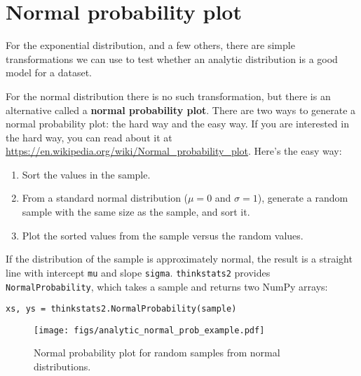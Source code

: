 \documentclass[12pt]{book}
\begin{document}
\section{Normal probability plot}

For the exponential distribution, and a few others, there are
simple transformations we can use to test whether an analytic
distribution is a good model for a dataset.

For the normal distribution there is no such transformation, but there
is an alternative called a {\bf normal probability plot}.  There
are two ways to generate a normal probability plot: the hard way
and the easy way.  If you are interested in the hard way, you can
read about it at \url{https://en.wikipedia.org/wiki/Normal_probability_plot}.
Here's the easy way:

\begin{enumerate}

\item Sort the values in the sample.

\item From a standard normal distribution ($\mu=0$ and $\sigma=1$),
generate a random sample with the same size as the sample, and sort it.

\item Plot the sorted values from the sample versus the random values.

\end{enumerate}

If the distribution of the sample is approximately normal, the result
is a straight line with intercept {\tt mu} and slope {\tt sigma}.
{\tt thinkstats2} provides {\tt NormalProbability}, which takes a
sample and returns two NumPy arrays:

\begin{verbatim}
xs, ys = thinkstats2.NormalProbability(sample)
\end{verbatim}

\begin{figure}
\centerline{\texttt{[image: figs/analytic\_normal\_prob\_example.pdf]}}
\caption{Normal probability plot for random samples from normal distributions.}
\label{analytic_normal_prob_example}
\end{figure}
\end{document}
